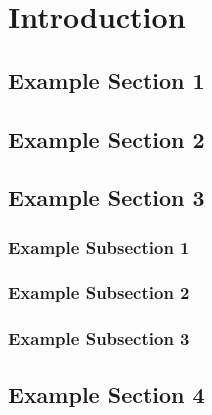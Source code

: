\documentclass{report}
\begin{document}
	
	
	
	
	
	
	
	


	\chapter{Introduction}


	\section{Example Section 1}
	\blindtext[2]
	\blindtext[2]
	\section{Example Section 2}
	\blindtext[5]
	\section{Example Section 3}
	\subsection{Example Subsection 1}
	\blindtext[5]
	\subsection{Example Subsection 2}
	\blindtext[5]
	\subsection{Example Subsection 3}
	\blindtext[5]
	\section{Example Section 4}
	\blindtext[5]
\end{document}
